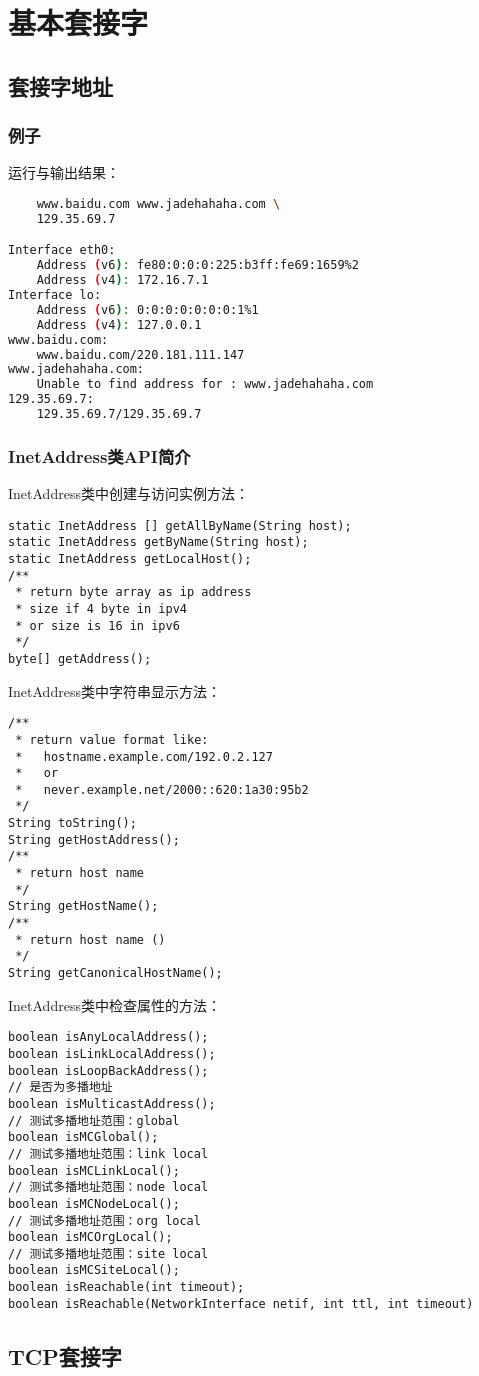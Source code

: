 
\chapter{基本套接字}

	\section{套接字地址}

		\subsection{例子}

		

		运行与输出结果：

\begin{lstlisting}[language=Bash]
% java InetAddressExample \
	www.baidu.com www.jadehahaha.com \
	129.35.69.7

Interface eth0:
	Address (v6): fe80:0:0:0:225:b3ff:fe69:1659%2
	Address (v4): 172.16.7.1
Interface lo:
	Address (v6): 0:0:0:0:0:0:0:1%1
	Address (v4): 127.0.0.1
www.baidu.com: 
	www.baidu.com/220.181.111.147
www.jadehahaha.com: 
	Unable to find address for : www.jadehahaha.com
129.35.69.7: 
	129.35.69.7/129.35.69.7
\end{lstlisting}

		\subsection{InetAddress类API简介}

			InetAddress类中创建与访问实例方法：
\begin{lstlisting}
static InetAddress [] getAllByName(String host);
static InetAddress getByName(String host);
static InetAddress getLocalHost();
/**
 * return byte array as ip address
 * size if 4 byte in ipv4
 * or size is 16 in ipv6
 */
byte[] getAddress();
\end{lstlisting}

			InetAddress类中字符串显示方法：
\begin{lstlisting}
/**
 * return value format like:
 *   hostname.example.com/192.0.2.127
 *   or
 *   never.example.net/2000::620:1a30:95b2
 */
String toString();
String getHostAddress();
/**
 * return host name
 */
String getHostName();
/**
 * return host name ()
 */
String getCanonicalHostName();
\end{lstlisting}

			InetAddress类中检查属性的方法：
\begin{lstlisting}
boolean isAnyLocalAddress();
boolean isLinkLocalAddress();
boolean isLoopBackAddress();
// 是否为多播地址
boolean isMulticastAddress();
// 测试多播地址范围：global
boolean isMCGlobal();
// 测试多播地址范围：link local
boolean isMCLinkLocal();
// 测试多播地址范围：node local
boolean isMCNodeLocal();
// 测试多播地址范围：org local
boolean isMCOrgLocal();
// 测试多播地址范围：site local
boolean isMCSiteLocal();
boolean isReachable(int timeout);
boolean isReachable(NetworkInterface netif, int ttl, int timeout)
\end{lstlisting}


	\section{TCP套接字}
